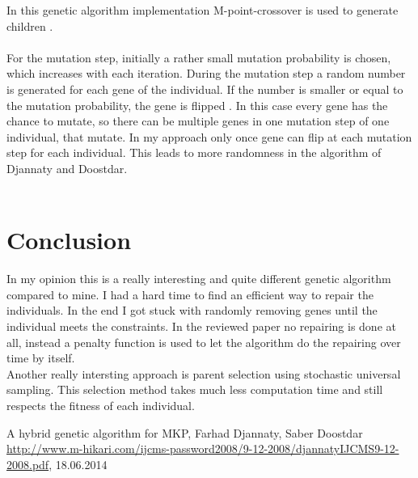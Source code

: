 \documentclass[fontsize=12pt,toc=bibliography, notitlepage]{scrreprt}
\begin{document}
In this genetic algorithm implementation M-point-crossover is used to generate children \cite[p. 7]{bib:hybrid-ga}. \\ \\
For the mutation step, initially a rather small mutation probability is chosen, which increases with each iteration. During the mutation step a random number is generated for each gene of the individual. If the number is smaller or equal to the mutation probability, the gene is flipped \cite[p. 7 - 8]{bib:hybrid-ga}. In this case every gene has the chance to mutate, so there can be multiple genes in one mutation step of one individual, that mutate. In my approach only once gene can flip at each mutation step for each individual. This leads to more randomness in the algorithm of Djannaty and Doostdar. \\ \\

\section{Conclusion}
\label{sec:rev-con}
In my opinion this is a really interesting and quite different genetic algorithm compared to mine. I had a hard time to find an efficient way to repair the individuals. In the end I got stuck with randomly removing genes until the individual meets the constraints. In the reviewed paper no repairing is done at all, instead a penalty function is used to let the algorithm do the repairing over time by itself. \\
Another really intersting approach is parent selection using stochastic universal sampling. This selection method takes much less computation time and still respects the fitness of each individual. \\

\begin{thebibliography}{999}
	\raggedright
	 A hybrid genetic algorithm for MKP, Farhad Djannaty, Saber Doostdar \url{http://www.m-hikari.com/ijcms-password2008/9-12-2008/djannatyIJCMS9-12-2008.pdf}, 18.06.2014
\end{thebibliography}

\cleardoublepage
{}
\listoffigures
\end{document}
